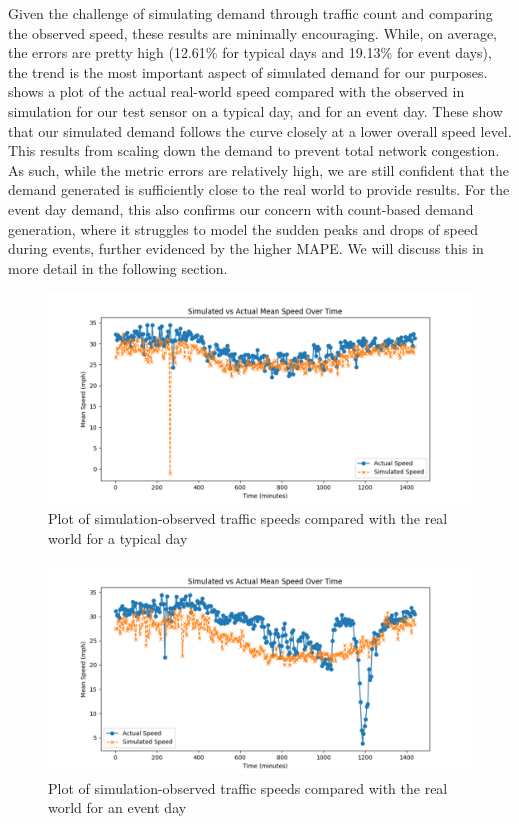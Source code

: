 Given the challenge of simulating demand through traffic count and comparing the observed speed, these results are minimally encouraging. While, on average, the errors are pretty high (12.61\% for typical days and 19.13\% for event days), the trend is the most important aspect of simulated demand for our purposes.  shows a plot of the actual real-world speed compared with the observed in simulation for our test sensor on a typical day, and  for an event day. These show that our simulated demand follows the curve closely at a lower overall speed level. This results from scaling down the demand to prevent total network congestion. As such, while the metric errors are relatively high, we are still confident that the demand generated is sufficiently close to the real world to provide results. For the event day demand, this also confirms our concern with count-based demand generation, where it struggles to model the sudden peaks and drops of speed during events, further evidenced by the higher MAPE. We will discuss this in more detail in the following section.

\begin{figure}[!ht]
  \centering
  \includegraphics[width=\textwidth]{images/results-discussions/demand-normal.pdf}
  \caption{Plot of simulation-observed traffic speeds compared with the real world for a typical day}
  \label{fig:demand-normal}
\end{figure}

\begin{figure}[!ht]
  \centering
  \includegraphics[width=\textwidth]{images/results-discussions/demand-event.pdf}
  \caption{Plot of simulation-observed traffic speeds compared with the real world for an event day}
  \label{fig:demand-event}
\end{figure}

